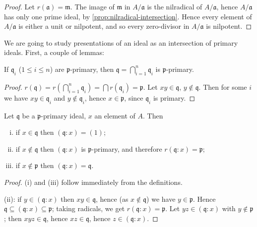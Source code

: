 \begin{proof}
    Let $r(\mathfrak{a}) = \mathfrak{m}$. The image of $\mathfrak{m}$ in $A/\mathfrak{a}$ is the nilradical of $A/\mathfrak{a}$, hence $A/\mathfrak{a}$ has only one prime ideal, by \eqref{prop:nilradical-intersection}. Hence every element of $A/\mathfrak{a}$ is either a unit or nilpotent, and so every zero-divisor in $A/\mathfrak{a}$ is nilpotent.
\end{proof}

We are going to study presentations of an ideal as an intersection of primary ideals. First, a couple of lemmas:

\begin{lemma}\label{lem:intersection-primary}
    If $\mathfrak{q}_i$ ($1 \leq i \leq n$) are $\mathfrak{p}$-primary, then $\mathfrak{q} = \bigcap_{i=1}^n \mathfrak{q}_i$ is $\mathfrak{p}$-primary.
\end{lemma}

\begin{proof}
    $r(\mathfrak{q}) = r(\bigcap_{i=1}^n \mathfrak{q}_i) = \bigcap r(\mathfrak{q}_i) = \mathfrak{p}$. Let $xy \in \mathfrak{q}$, $y \notin \mathfrak{q}$. Then for some $i$ we have $xy \in \mathfrak{q}_i$ and $y \notin \mathfrak{q}_i$, hence $x \in \mathfrak{p}$, since $\mathfrak{q}_i$ is primary.
\end{proof}

\begin{lemma}\label{lem:colon-primary}
Let $\mathfrak{q}$ be a $\mathfrak{p}$-primary ideal, $x$ an element of $A$. Then
\begin{enumerate}[i)]
    \item if $x \in \mathfrak{q}$ then $(\mathfrak{q} : x) = (1)$;
    \item if $x \notin \mathfrak{q}$ then $(\mathfrak{q} : x)$ is $\mathfrak{p}$-primary, and therefore $r(\mathfrak{q} : x) = \mathfrak{p}$;
    \item if $x \notin \mathfrak{p}$ then $(\mathfrak{q} : x) = \mathfrak{q}$.
\end{enumerate}
\end{lemma}

\begin{proof}
(i) and (iii) follow immediately from the definitions.

(ii): if $y \in (\mathfrak{q} : x)$ then $xy \in \mathfrak{q}$, hence (as $x \notin \mathfrak{q}$) we have $y \in \mathfrak{p}$. Hence $\mathfrak{q} \subseteq (\mathfrak{q} : x) \subseteq \mathfrak{p}$; taking radicals, we get $r(\mathfrak{q} : x) = \mathfrak{p}$. Let $yz \in (\mathfrak{q} : x)$ with $y \notin \mathfrak{p}$; then $xyz \in \mathfrak{q}$, hence $xz \in \mathfrak{q}$, hence $z \in (\mathfrak{q} : x)$.
\end{proof}

